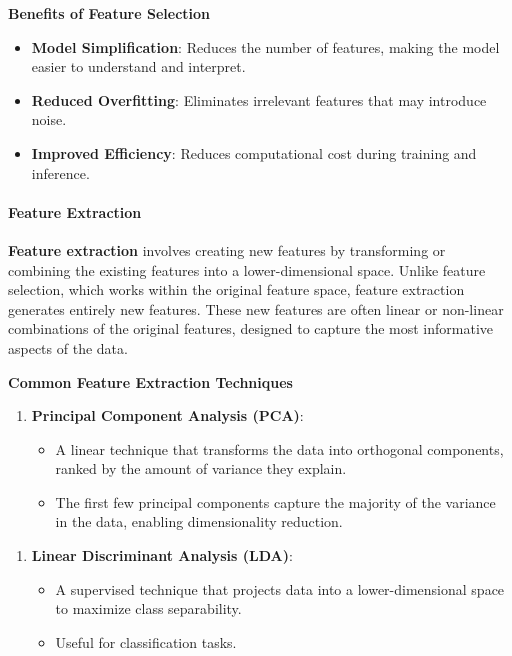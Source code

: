\documentclass{article}
\providecommand{\tightlist}{%
      \setlength{\itemsep}{0pt}\setlength{\parskip}{0pt}}
\begin{document}
\textbf{Benefits of Feature Selection}

\begin{itemize}
\tightlist
\item
  \textbf{Model Simplification}: Reduces the number of features, making
  the model easier to understand and interpret.
\item
  \textbf{Reduced Overfitting}: Eliminates irrelevant features that may
  introduce noise.
\item
  \textbf{Improved Efficiency}: Reduces computational cost during
  training and inference.
\end{itemize}

    \paragraph{Feature Extraction}\label{feature-extraction}

\textbf{Feature extraction} involves creating new features by
transforming or combining the existing features into a lower-dimensional
space. Unlike feature selection, which works within the original feature
space, feature extraction generates entirely new features. These new
features are often linear or non-linear combinations of the original
features, designed to capture the most informative aspects of the data.

\textbf{Common Feature Extraction Techniques}

\begin{enumerate}
\def\labelenumi{\arabic{enumi}.}
\tightlist
\item
  \textbf{Principal Component Analysis (PCA)}:

  \begin{itemize}
  \tightlist
  \item
    A linear technique that transforms the data into orthogonal
    components, ranked by the amount of variance they explain.
  \item
    The first few principal components capture the majority of the
    variance in the data, enabling dimensionality reduction.
  \end{itemize}
\end{enumerate}

\begin{enumerate}
\def\labelenumi{\arabic{enumi}.}
\setcounter{enumi}{1}
\tightlist
\item
  \textbf{Linear Discriminant Analysis (LDA)}:

  \begin{itemize}
  \tightlist
  \item
    A supervised technique that projects data into a lower-dimensional
    space to maximize class separability.
  \item
    Useful for classification tasks.
  \end{itemize}
\end{enumerate}
\end{document}

